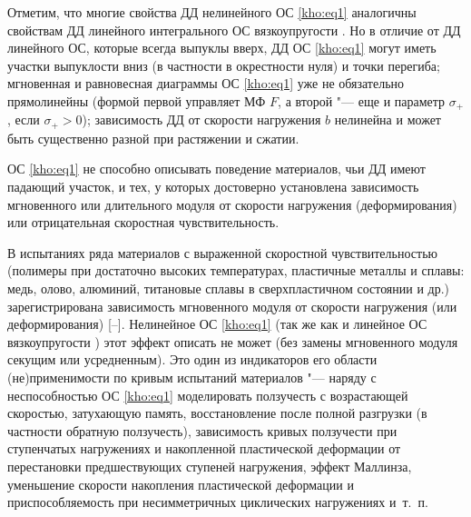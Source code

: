 Отметим, что многие свойства ДД нелинейного ОС \eqref{kho:eq1} аналогичны свойствам ДД линейного интегрального ОС вязкоупругости \cite{kho:bib51,kho:bib52}. Но в отличие от ДД линейного ОС, которые всегда выпуклы вверх, ДД ОС \eqref{kho:eq1} могут иметь участки выпуклости вниз (в частности в окрестности нуля) и точки перегиба; мгновенная и равновесная диаграммы ОС \eqref{kho:eq1} уже не обязательно прямолинейны (формой первой управляет МФ $F$, а второй "--- еще и параметр $\sigma_{+}$, если $\sigma_{+}>0$); зависимость ДД от скорости нагружения $b$ нелинейна и может быть существенно разной при растяжении и сжатии. 



ОС \eqref{kho:eq1} не способно описывать поведение материалов, чьи ДД имеют падающий участок, и тех, у которых достоверно установлена зависимость мгновенного или длительного модуля от скорости нагружения (деформирования) или отрицательная скоростная чувствительность. 



В испытаниях ряда материалов с выраженной скоростной чувствительностью (полимеры при достаточно высоких температурах, пластичные металлы и сплавы: медь, олово, алюминий, титановые сплавы в сверхпластичном состоянии и др.) зарегистрирована зависимость мгновенного модуля от скорости нагружения (или деформирования) [--]. Нелинейное ОС \eqref{kho:eq1} (так же как и линейное ОС вязкоупругости \cite{kho:bib51,kho:bib52}) этот эффект описать не может (без замены мгновенного модуля секущим или усредненным). Это один из индикаторов его области (не)применимости по кривым испытаний материалов "--- наряду с неспособностью ОС \eqref{kho:eq1} моделировать ползучесть с возрастающей скоростью, затухающую память, восстановление после полной разгрузки (в частности обратную ползучесть), зависимость кривых ползучести при ступенчатых нагружениях и накопленной пластической деформации от перестановки предшествующих ступеней нагружения, эффект Маллинза, уменьшение скорости накопления пластической деформации и приспособляемость при несимметричных циклических нагружениях \cite{kho:bib1,kho:bib2,kho:bib3,kho:bib4,kho:bib5,kho:bib6,kho:bib7,kho:bib8}  и~т.~п. 



